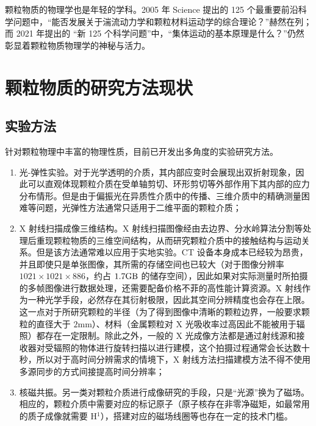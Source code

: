颗粒物质的物理学也是年轻的学科。2005 年 Science 提出的 125 个最重要前沿科学问题\cite{doi:10.1126/science.309.5731.78b}中，“能否发展关于湍流动力学和颗粒材料运动学的综合理论？”赫然在列；而 2021 年提出的 “新 125 个科学问题”\cite{sanders2021125}中，“集体运动的基本原理是什么？”仍然彰显着颗粒物质物理学的神秘与活力。

\section{颗粒物质的研究方法现状}


\subsection{实验方法}

针对颗粒物理中丰富的物理性质，目前已开发出多角度的实验研究方法。

\begin{enumerate}
  \item 光-弹性实验\cite{photoelasticimetry}。对于光学透明的介质，其内部应变时会展现出双折射现象，因此可以直观体现颗粒介质在受单轴剪切、环形剪切等外部作用下其内部的应力分布情形。但是由于偏振光在异质性介质中的传播、三维介质中的精确测量困难等问题\cite{Non-Destructive_3D_Photoelasticity}，光弹性方法通常只适用于二维平面的颗粒介质；
  \item X 射线扫描成像三维结构\cite{PhysRevE.68.020301}。X 射线扫描图像经由去边界、分水岭算法分割等处理后重现颗粒物质的三维空间结构，从而研究颗粒介质中的接触结构与运动关系。但是该方法通常难以应用于实地实验。CT 设备本身成本已经较为昂贵，并且即使只是单张图像，其所需的存储空间也已较大（对于图像分辨率 $1021\times 1021 \times 886$，约占 $1.7\unit{\giga\byte}$ 的储存空间），因此如果对实际测量时所拍摄的多帧图像进行数据处理，还需要配备价格不菲的高性能计算资源。X 射线作为一种光学手段，必然存在其衍射极限，因此其空间分辨精度也会存在上限。这一点对于所研究颗粒的半径（为了得到图像中清晰的颗粒边界，一般要求颗粒的直径大于 $2\unit{\milli\meter}$）、材料（金属颗粒对 X 光吸收率过高因此不能被用于辐照）都存在一定限制。除此之外，一般的 X 光成像方法都是通过射线源和接收器对受辐照的物体进行旋转扫描以进行建模，这个拍摄过程通常会长达数十秒，所以对于高时间分辨需求的情境下，X 射线方法扫描建模方法不得不使用多源同步\cite{wang2008ultrafast}的方式间接提高时间分辨率；
  \item 核磁共振\cite{CLARKE2023}。另一类对颗粒介质进行成像研究的手段，只是“光源”换为了磁场。相应的，颗粒介质中需要对应的标记原子（原子核存在非零净磁矩，如最常用的质子成像就需要 H$^{1}$），搭建对应的磁场线圈等也存在一定的技术门槛。
\end{enumerate}

